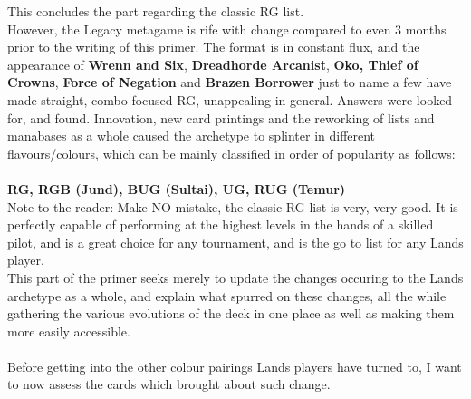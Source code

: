 \documentclass{report}
\begin{document}
This concludes the part regarding the classic RG list.\\
However, the Legacy metagame is rife with change compared to even 3 months prior to the writing of this primer. The format is in constant flux, and the appearance of \textbf{Wrenn and Six}, \textbf{Dreadhorde Arcanist}, \textbf{Oko, Thief of Crowns}, \textbf{Force of Negation} and \textbf{Brazen Borrower} just to name a few have made straight, combo focused RG, unappealing in general. Answers were looked for, and found. Innovation, new card printings and the reworking of lists and manabases as a whole caused the archetype to splinter in different flavours/colours, which can be mainly classified in order of popularity as follows:\\\\
\textbf{RG, RGB (Jund), BUG (Sultai), UG, RUG (Temur)}\\
Note to the reader: Make NO mistake, the classic RG list is very, very good. It is perfectly capable of performing at the highest levels in the hands of a skilled pilot, and is a great choice for any tournament, and is the go to list for any Lands player.\\
This part of the primer seeks merely to update the changes occuring to the Lands archetype as a whole, and explain what spurred on these changes, all the while gathering the various evolutions of the deck in one place as well as making them more easily accessible.\\\\
Before getting into the other colour pairings Lands players have turned to, I want to now assess the cards which brought about such change.
\end{document}
